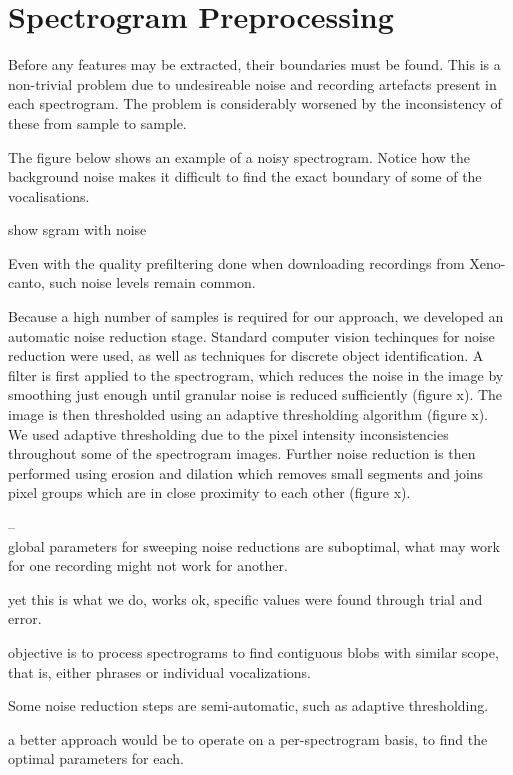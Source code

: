 \section{Spectrogram Preprocessing}\label{sec:preproc}

Before any features may be extracted, their boundaries must be found.
This is a non-trivial problem due to undesireable noise and recording artefacts
present in each spectrogram.
The problem is considerably worsened by the inconsistency of these from sample
to sample.

The figure below shows an example of a noisy spectrogram.
Notice how the background noise makes it difficult to find the exact boundary of
some of the vocalisations.

show sgram with noise

Even with the quality prefiltering done when downloading recordings from
Xeno-canto, such noise levels remain common.

Because a high number of samples is required for our approach, we developed an
automatic noise reduction stage.
Standard computer vision techinques for noise reduction were used, as well as
techniques for discrete object identification.
A filter is first applied to the spectrogram, which reduces the noise in the
image by smoothing just enough until granular noise is reduced sufficiently (figure x).
The image is then thresholded using an adaptive thresholding algorithm (figure x).
We used adaptive thresholding due to the pixel intensity inconsistencies
throughout some of the spectrogram images.
Further noise reduction is then performed using erosion and dilation which
removes small segments and joins pixel groups which are in close proximity to
each other (figure x).

--\\

global parameters for sweeping noise reductions are suboptimal, what may work
for one recording might not work for another.

yet this is what we do, works ok, specific values were found through trial and
error.

objective is to process spectrograms to find contiguous blobs with similar
scope, that is, either phrases or individual vocalizations.

Some noise reduction steps are semi-automatic, such as adaptive thresholding.

a better approach would be to operate on a per-spectrogram basis, to find the
optimal parameters for each.

